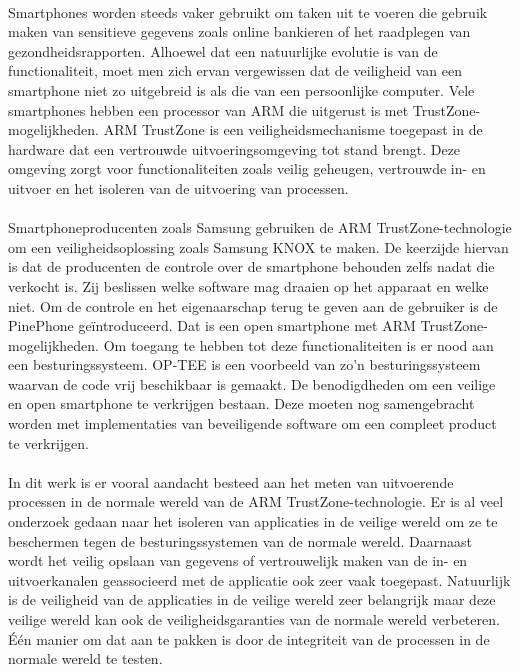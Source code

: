\documentclass[master=cws,masteroption=vs,english]{kulemt}
\begin{document}
\begin{abstract*}

\paragraph*{}
Smartphones worden steeds vaker gebruikt om taken uit te voeren die gebruik maken van sensitieve gegevens zoals online bankieren of het raadplegen van gezondheidsrapporten. Alhoewel dat een natuurlijke evolutie is van de functionaliteit, moet men zich ervan vergewissen dat de veiligheid van een smartphone niet zo uitgebreid is als die van een persoonlijke computer. Vele smartphones hebben een processor van ARM die uitgerust is met TrustZone-mogelijkheden. ARM TrustZone is een veiligheidsmechanisme toegepast in de hardware dat een vertrouwde uitvoeringsomgeving tot stand brengt. Deze omgeving zorgt voor functionaliteiten zoals veilig geheugen, vertrouwde in- en uitvoer en het isoleren van de uitvoering van processen.

\paragraph*{}
Smartphoneproducenten zoals Samsung gebruiken de ARM TrustZone-technologie om een veiligheidsoplossing zoals Samsung KNOX te maken. De keerzijde hiervan is dat de producenten de controle over de smartphone behouden zelfs nadat die verkocht is. Zij beslissen welke software mag draaien op het apparaat en welke niet. Om de controle en het eigenaarschap terug te geven aan de gebruiker is de PinePhone ge\"introduceerd. Dat is een open smartphone met ARM TrustZone-mogelijkheden. Om toegang te hebben tot deze functionaliteiten is er nood aan een besturingssysteem. OP-TEE is een voorbeeld van zo'n besturingssysteem waarvan de code vrij beschikbaar is gemaakt. De benodigdheden om een veilige en open smartphone te verkrijgen bestaan. Deze moeten nog samengebracht worden met implementaties van beveiligende software om een compleet product te verkrijgen.

\paragraph*{}
In dit werk is er vooral aandacht besteed aan het meten van uitvoerende processen in de normale wereld van de ARM TrustZone-technologie. Er is al veel onderzoek gedaan naar het isoleren van applicaties in de veilige wereld om ze te beschermen tegen de besturingssystemen van de normale wereld. Daarnaast wordt het veilig opslaan van gegevens of vertrouwelijk maken van de in- en uitvoerkanalen geassocieerd met de applicatie ook zeer vaak toegepast. Natuurlijk is de veiligheid van de applicaties in de veilige wereld zeer belangrijk maar deze veilige wereld kan ook de veiligheidsgaranties van de normale wereld verbeteren. \'E\'en manier om dat aan te pakken is door de integriteit van de processen in de normale wereld te testen. 

\end{abstract*}
\end{document}
